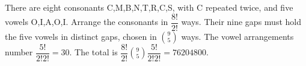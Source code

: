 There are eight consonants C,M,B,N,T,R,C,S, with C repeated twice, and five vowels O,I,A,O,I. Arrange the consonants in $\dfrac{8!}{2!}$ ways. Their nine gaps must hold the five vowels in distinct gaps, chosen in $\binom 95$ ways. The vowel arrangements number $\dfrac{5!}{2!2!}=30$. The total is $\boxed{\dfrac{8!}{2!}\binom 95\dfrac{5!}{2!2!}=76204800}$.
